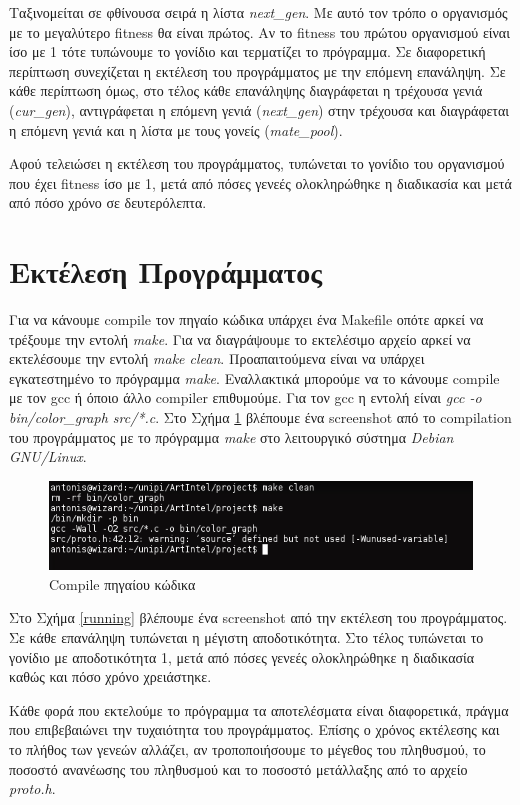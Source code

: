 \documentclass{article}
\begin{document}
Ταξινομείται σε φθίνουσα σειρά η λίστα \emph{next\_gen}. Με αυτό τον τρόπο ο
οργανισμός με το μεγαλύτερο fitness θα είναι πρώτος. Αν το fitness του πρώτου
οργανισμού είναι ίσο με 1 τότε τυπώνουμε το γονίδιο και τερματίζει το πρόγραμμα.
Σε διαφορετική περίπτωση συνεχίζεται η εκτέλεση του προγράμματος με την επόμενη
επανάληψη. Σε κάθε περίπτωση όμως, στο τέλος κάθε επανάληψης διαγράφεται η
τρέχουσα γενιά (\emph{cur\_gen}), αντιγράφεται η επόμενη γενιά
(\emph{next\_gen}) στην τρέχουσα και διαγράφεται η επόμενη γενιά και η λίστα με
τους γονείς (\emph{mate\_pool}).

Αφού τελειώσει η εκτέλεση του προγράμματος, τυπώνεται το γονίδιο του οργανισμού
που έχει fitness ίσο με 1, μετά από πόσες γενεές ολοκληρώθηκε η διαδικασία και
μετά από πόσο χρόνο σε δευτερόλεπτα.

\section{Εκτέλεση Προγράμματος}
Για να κάνουμε compile τον πηγαίο κώδικα υπάρχει ένα Makefile οπότε αρκεί να
τρέξουμε την εντολή \emph{make}. Για να διαγράψουμε το εκτελέσιμο αρχείο αρκεί
να εκτελέσουμε την εντολή \emph{make clean}. Προαπαιτούμενα είναι να υπάρχει
εγκατεστημένο το
πρόγραμμα \emph{make}. Εναλλακτικά μπορούμε να το κάνουμε compile με τον gcc ή
όποιο άλλο compiler επιθυμούμε. Για τον gcc η εντολή είναι \emph{gcc -o
bin/color\_graph src/*.c}.
Στο Σχήμα \ref{compile} βλέπουμε ένα screenshot από το compilation του προγράμματος
με το πρόγραμμα \emph{make} στο λειτουργικό σύστημα \emph{Debian GNU/Linux}.
\begin{figure}[tbh]
\centering
\includegraphics[scale=0.7]{make.png}
\caption{Compile πηγαίου κώδικα}
\label{compile}
\end{figure}

Στο Σχήμα \ref{running} βλέπουμε ένα screenshot από την εκτέλεση του
προγράμματος. Σε κάθε επανάληψη τυπώνεται η μέγιστη αποδοτικότητα. Στο
τέλος τυπώνεται το γονίδιο με αποδοτικότητα 1, μετά από πόσες γενεές
ολοκληρώθηκε η διαδικασία καθώς και πόσο χρόνο χρειάστηκε.

Κάθε φορά που εκτελούμε το πρόγραμμα τα αποτελέσματα είναι διαφορετικά, πράγμα
που επιβεβαιώνει την τυχαιότητα του προγράμματος. Επίσης ο χρόνος εκτέλεσης και
το πλήθος των γενεών αλλάζει, αν τροποποιήσουμε το μέγεθος του πληθυσμού, το
ποσοστό ανανέωσης του πληθυσμού και το ποσοστό μετάλλαξης από το αρχείο
\emph{proto.h}.
\end{document}
